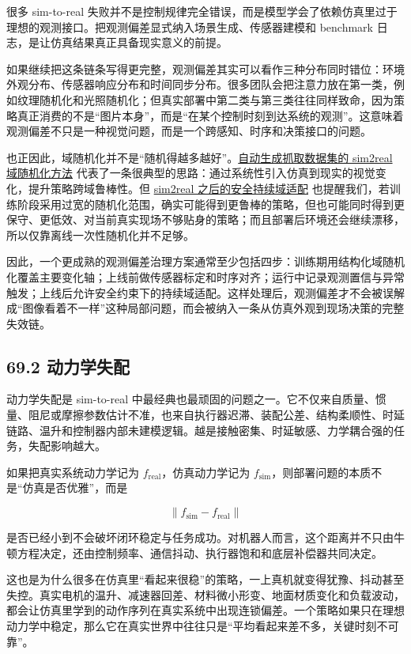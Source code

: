 很多 sim-to-real 失败并不是控制规律完全错误，而是模型学会了依赖仿真里过于理想的观测接口。把观测偏差显式纳入场景生成、传感器建模和 benchmark 日志，是让仿真结果真正具备现实意义的前提。

如果继续把这条链条写得更完整，观测偏差其实可以看作三种分布同时错位：环境外观分布、传感器响应分布和时间同步分布。很多团队会把注意力放在第一类，例如纹理随机化和光照随机化；但真实部署中第二类与第三类往往同样致命，因为策略真正消费的不是“图片本身”，而是“在某个控制时刻到达系统的观测”。这意味着观测偏差不只是一种视觉问题，而是一个跨感知、时序和决策接口的问题。

也正因此，域随机化并不是“随机得越多越好”。\href{https://arxiv.org/abs/2310.04517}{自动生成抓取数据集的 sim2real 域随机化方法} 代表了一条很典型的思路：通过系统性引入仿真到现实的视觉变化，提升策略跨域鲁棒性。但 \href{https://arxiv.org/abs/2503.10949}{sim2real 之后的安全持续域适配} 也提醒我们，若训练阶段采用过宽的随机化范围，确实可能得到更鲁棒的策略，但也可能同时得到更保守、更低效、对当前真实现场不够贴身的策略；而且部署后环境还会继续漂移，所以仅靠离线一次性随机化并不足够。

因此，一个更成熟的观测偏差治理方案通常至少包括四步：训练期用结构化域随机化覆盖主要变化轴；上线前做传感器标定和时序对齐；运行中记录观测置信与异常触发；上线后允许安全约束下的持续域适配。这样处理后，观测偏差才不会被误解成“图像看着不一样”这种局部问题，而会被纳入一条从仿真外观到现场决策的完整失效链。

\subsection*{69.2 动力学失配}


动力学失配是 sim-to-real 中最经典也最顽固的问题之一。它不仅来自质量、惯量、阻尼或摩擦参数估计不准，也来自执行器迟滞、装配公差、结构柔顺性、时延链路、温升和控制器内部未建模逻辑。越是接触密集、时延敏感、力学耦合强的任务，失配影响越大。

如果把真实系统动力学记为 \(f_{\text{real}}\)，仿真动力学记为 \(f_{\text{sim}}\)，则部署问题的本质不是“仿真是否优雅”，而是

\begin{equation*}
\| f_{\text{sim}} - f_{\text{real}} \|
\end{equation*}

是否已经小到不会破坏闭环稳定与任务成功。对机器人而言，这个距离并不只由牛顿方程决定，还由控制频率、通信抖动、执行器饱和和底层补偿器共同决定。

这也是为什么很多在仿真里“看起来很稳”的策略，一上真机就变得犹豫、抖动甚至失控。真实电机的温升、减速器回差、材料微小形变、地面材质变化和负载波动，都会让仿真里学到的动作序列在真实系统中出现连锁偏差。一个策略如果只在理想动力学中稳定，那么它在真实世界中往往只是“平均看起来差不多，关键时刻不可靠”。

